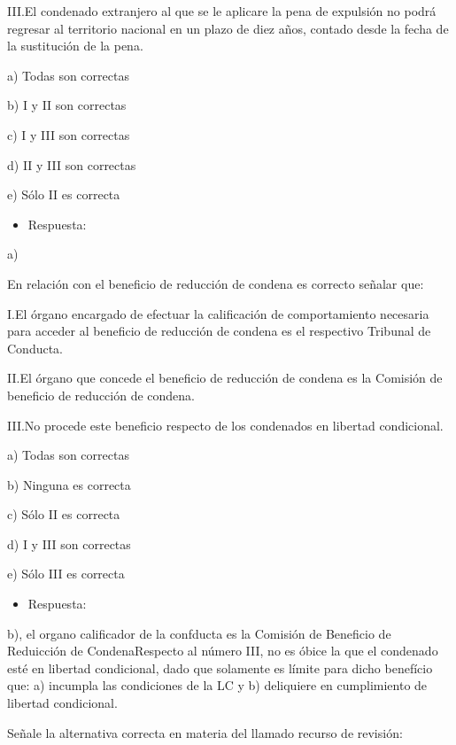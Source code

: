 \documentclass[letterpaper, 11pt]{article}
\begin{document}
III.El condenado extranjero al que se le aplicare la pena de expulsión
no podrá regresar al territorio nacional en un plazo de diez años, contado
desde la fecha de la sustitución de la pena.





a) Todas son correctas

b) I y II son correctas

c) I y III son correctas

d) II y III son correctas

e) Sólo II es correcta


\begin{itemize}
\item Respuesta:
\end{itemize}

a)



En relación con el beneficio de reducción de condena es correcto
señalar que:


I.El órgano encargado de efectuar la calificación de comportamiento
necesaria para acceder al beneficio de reducción de condena es el
respectivo Tribunal de Conducta.



II.El órgano que concede el beneficio de reducción de condena es la
Comisión de beneficio de reducción de condena.



III.No procede este beneficio respecto de los condenados en libertad
condicional.




a) Todas son correctas

b) Ninguna es correcta

c) Sólo II es correcta

d) I y III son correctas

e) Sólo III es correcta


\begin{itemize}
\item Respuesta:
\end{itemize}

b), el organo calificador de la confducta es la Comisión de Beneficio
  de Reduicción de CondenaRespecto al número III, no es óbice la que
  el condenado esté en libertad condicional, dado que solamente es
  límite para dicho benefício que: a) incumpla las condiciones de la
  LC y b) deliquiere en cumplimiento de libertad condicional.


Señale la alternativa correcta en materia del llamado recurso de
revisión:
\end{document}
